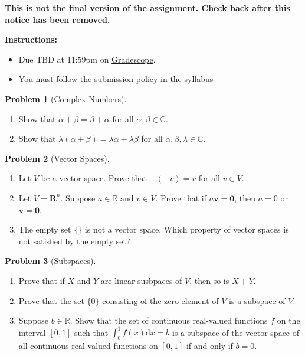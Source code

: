 \documentclass[12pt]{article}
\theoremstyle{definition}
\newtheorem{problem}{Problem}
\renewcommand{\d}{\mathrm{d}}
\renewcommand{\vec}{\mathbf}
\begin{document}
\textbf{\Large{}}
    
\vspace{-1.8em}
\hrulefill

\textbf{
This is not the final version of the assignment.
Check back after this notice has been removed.}

\textbf{Instructions:}
    \begin{itemize}
        \item Due TBD at 11:59pm on \href{https://www.gradescope.com/courses/709136}{Gradescope}.
        \item You must follow the submission policy in the \href{https://courses.chen.pw/la_s2024/syllabus.html}{syllabus} 
\end{itemize}
   
\vspace{.5em}

\begin{problem}[Complex Numbers]~
    \begin{enumerate}
        \item  Show that $\alpha +\beta = \beta + \alpha$ for all $\alpha,\beta \in \mathbb{C}$.
        \item Show that $\lambda (\alpha + \beta) = \lambda \alpha + \lambda \beta$ for all $\alpha, \beta,\lambda \in \mathbb{C}$.
    \end{enumerate}
\end{problem}

\begin{problem}[Vector Spaces]~
    \begin{enumerate}
        \item Let $V$ be a vector space. Prove that $-(-v) = v$ for all $v\in V$.
        \item Let $V = \vec{R}^n$. Suppose $a\in \mathbb{R}$ and $v\in V$. Prove that if $a \vec{v} = \vec{0}$, then $a = 0$ or $\vec{v} = \vec{0}$.
        \item The empty set $\{\}$ is not a vector space. Which property of vector spaces is not satisfied by the empty set?
    \end{enumerate}
\end{problem}

\begin{problem}[Subspaces]~
\begin{enumerate}
    \item Prove that if $X$ and $Y$ are linear susbpaces of $V$, then so is $X+Y$.
\item Prove that the set $\{0\}$ consisting of the zero element of $V$ is a subspace of $V$.
\item Suppose $b\in\mathbb{R}$. 
Show that the set of continuous real-valued functions $f$ on the interval $[0,1]$ such that $\int_0^1 f(x) \d x = b$ is a subspace of the vector space of all continuous real-valued functions on $[0,1]$ if and only if $b=0$.
\end{enumerate}
\end{problem}
        
\end{document}
